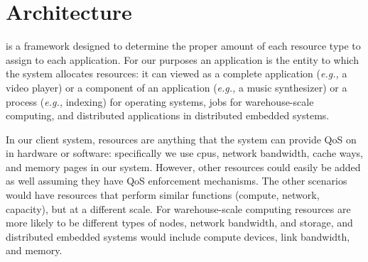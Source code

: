\section{\pacora Architecture}




\pacora is a framework designed to determine the proper amount of each resource type to assign to each application.  For our purposes an application is the entity to which the system allocates resources: it can viewed as a complete application (\emph{e.g.,} a video player) or a component of an application (\emph{e.g.,} a music synthesizer) or a process (\emph{e.g.,} indexing) for operating systems, jobs for warehouse-scale computing, and distributed applications in distributed embedded systems. 

In our client system, resources are anything that the system can provide QoS on in hardware or software: specifically we use cpus, network bandwidth, cache ways, and memory pages in our system.  However, other resources could easily be added as well assuming they have QoS enforcement mechanisms.  The other scenarios would have resources that perform similar functions (compute, network, capacity), but at a different scale. For warehouse-scale computing resources are more likely to be different types of nodes, network bandwidth, and storage, and distributed embedded systems would include compute devices, link bandwidth, and memory. 
 
